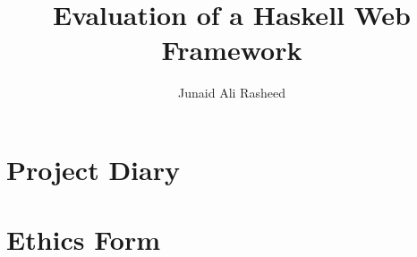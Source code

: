 \documentclass[a4paper,11pt,parskip,abstract=on,thesis,DIV=9]{scrreprt}
\title{Evaluation of a Haskell Web Framework}
\author{Junaid Ali Rasheed}
\begin{document}


\maketitle



\tableofcontents
\listoffigures

\begin{abstract}
\lipsum[1-3]
\end{abstract}




%
%
%
%

\printbibliography[heading=bibintoc,title={References}]

\begin{refsection}
\nocite{*}
\printbibliography[heading=bibintoc,title={Bibliography}]  
\end{refsection}

\begin{appendices}

\chapter{Project Diary}


\chapter{Ethics Form}


\end{appendices}
\end{document}
